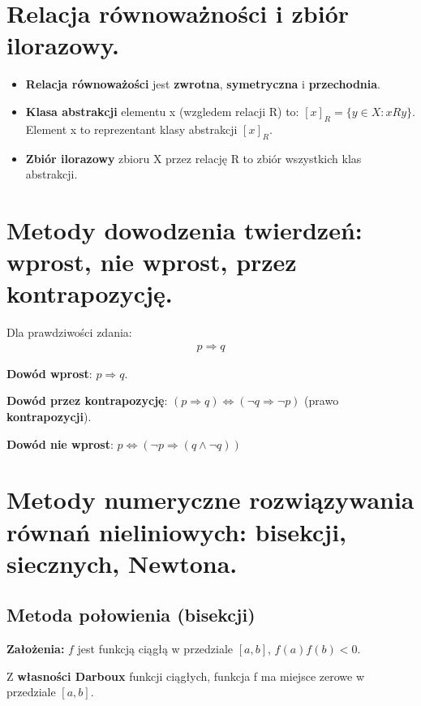 \documentclass[main.tex]{subfiles}
\begin{document}
    \section{Relacja równoważności i zbiór ilorazowy.}

    \begin{itemize}
        \item \textbf{Relacja równoważości} jest \textbf{zwrotna}, \textbf{symetryczna} i \textbf{przechodnia}.

        \item \textbf{Klasa abstrakcji} elementu x (wzgledem relacji R) to: $[x]_{R} = \{y \in X: xRy\}$. Element x to
        reprezentant klasy abstrakcji $[x]_{R}$.

        \item \textbf{Zbiór ilorazowy} zbioru X przez relację R to zbiór wszystkich klas abstrakcji.
    \end{itemize}


    \section{Metody dowodzenia twierdzeń: wprost, nie wprost, przez kontrapozycję.}

    Dla prawdziwości zdania:
    \begin{align*}
        p \Rightarrow q
    \end{align*}

    \textbf{Dowód wprost}: $ p \Rightarrow q$.

    \textbf{Dowód przez kontrapozycję}: $(p \Rightarrow q) \Leftrightarrow (\neg q \Rightarrow \neg p)$ (prawo \textbf{kontrapozycji}).

    \textbf{Dowód nie wprost}: $p \Leftrightarrow (\neg p \Rightarrow (q \wedge \neg q))$


    \section{Metody numeryczne rozwiązywania równań nieliniowych: bisekcji, siecznych, Newtona.}

    \subsection{Metoda połowienia (bisekcji)}

    \textbf{Założenia:} $f$ jest funkcją ciągłą w przedziale $[a,b]$, $f(a)f(b) < 0$.

    \noindent Z \textbf{własności Darboux} funkcji ciągłych, funkcja f ma miejsce zerowe w przedziale $[a,b]$.
\end{document}
